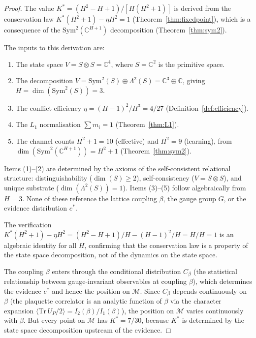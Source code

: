 \documentclass[11pt,a4paper]{article}
\theoremstyle{definition}
\theoremstyle{remark}
\newcommand{\C}{\mathbb{C}}
\begin{document}
\begin{proof}
The value $K^*=(H^2-H+1)/[H(H^2+1)]$ is derived from the conservation law $K^*(H^2+1)-\eta H^2=1$ (Theorem~\ref{thm:fixedpoint}), which is a consequence of the $\mathrm{Sym}^2(\C^{H+1})$ decomposition (Theorem~\ref{thm:sym2}).

The inputs to this derivation are:
\begin{enumerate}[nosep]
\item The state space $V=S\otimes S=\C^4$, where $S=\C^2$ is the primitive space.
\item The decomposition $V=\mathrm{Sym}^2(S)\oplus\Lambda^2(S)=\C^3\oplus\C$, giving $H=\dim(\mathrm{Sym}^2(S))=3$.
\item The conflict efficiency $\eta=(H-1)^2/H^3=4/27$ (Definition~\ref{def:efficiency}).
\item The $L_1$ normalisation $\sum m_i=1$ (Theorem~\ref{thm:L1}).
\item The channel counts $H^2+1=10$ (effective) and $H^2=9$ (learning), from $\dim(\mathrm{Sym}^2(\C^{H+1}))=H^2+1$ (Theorem~\ref{thm:sym2}).
\end{enumerate}
Items (1)--(2) are determined by the axioms of the self-consistent relational structure: distinguishability ($\dim(S)\geq 2$), self-consistency ($V=S\otimes S$), and unique substrate ($\dim(\Lambda^2(S))=1$). Items (3)--(5) follow algebraically from $H=3$. None of these reference the lattice coupling $\beta$, the gauge group $G$, or the evidence distribution $e^*$.

The verification $K^*(H^2+1)-\eta H^2=(H^2-H+1)/H-(H-1)^2/H=H/H=1$ is an algebraic identity for all $H$, confirming that the conservation law is a property of the state space decomposition, not of the dynamics on the state space.

The coupling $\beta$ enters through the conditional distribution $C_\beta$ (the statistical relationship between gauge-invariant observables at coupling $\beta$), which determines the evidence $e^*$ and hence the position on $\mathcal{M}$. Since $C_\beta$ depends continuously on $\beta$ (the plaquette correlator is an analytic function of $\beta$ via the character expansion $\langle\mathrm{Tr}\,U_P/2\rangle=I_2(\beta)/I_1(\beta)$), the position on $\mathcal{M}$ varies continuously with $\beta$. But every point on $\mathcal{M}$ has $K^*=7/30$, because $K^*$ is determined by the state space decomposition upstream of the evidence.
\end{proof}
\end{document}
